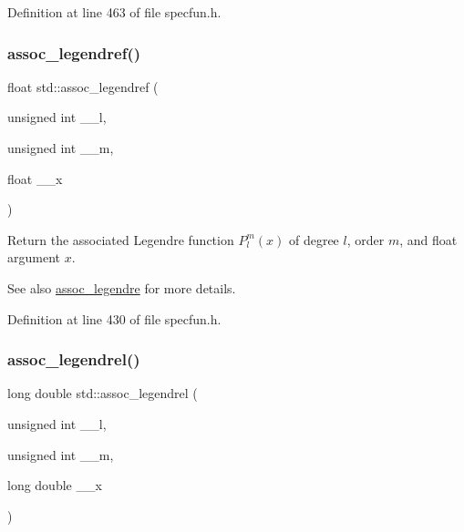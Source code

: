 Definition at line 463 of file specfun.\+h.

\mbox{\label{group__tr29124__math__spec__func_ga3ced07ddd24bf4af56e2712d148e7f57}} 
\subsubsection{\texorpdfstring{assoc\+\_\+legendref()}{assoc\_legendref()}}
{\footnotesize\ttfamily float std\+::assoc\+\_\+legendref (\begin{DoxyParamCaption}\item[{unsigned int}]{\+\_\+\+\_\+l,  }\item[{unsigned int}]{\+\_\+\+\_\+m,  }\item[{float}]{\+\_\+\+\_\+x }\end{DoxyParamCaption})\hspace{0.3cm}{\ttfamily [inline]}}

Return the associated Legendre function $ P_l^m(x) $ of degree $ l $, order $ m $, and {\ttfamily float} argument $ x $.

\begin{DoxySeeAlso}{See also}
\hyperlink{group__tr29124__math__spec__func_ga9df2525c1155eb8539e85323f18361a3}{assoc\+\_\+legendre} for more details. 
\end{DoxySeeAlso}


Definition at line 430 of file specfun.\+h.

\mbox{\label{group__tr29124__math__spec__func_ga55977b425a539146f060dec1c8003344}} 
\subsubsection{\texorpdfstring{assoc\+\_\+legendrel()}{assoc\_legendrel()}}
{\footnotesize\ttfamily long double std\+::assoc\+\_\+legendrel (\begin{DoxyParamCaption}\item[{unsigned int}]{\+\_\+\+\_\+l,  }\item[{unsigned int}]{\+\_\+\+\_\+m,  }\item[{long double}]{\+\_\+\+\_\+x }\end{DoxyParamCaption})\hspace{0.3cm}{\ttfamily [inline]}}


